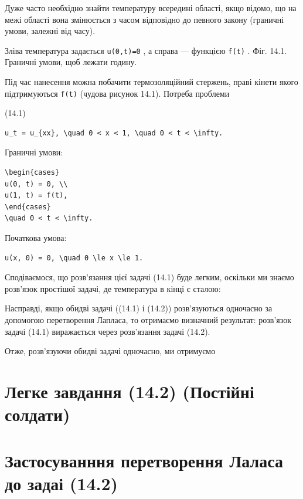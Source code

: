 \documentclass[
  ukrainian,
]{article}
\begin{document}
Дуже часто необхідно знайти температуру всередині області, якщо відомо,
що на межі області вона змінюється з часом відповідно до певного закону
(граничні умови, залежні від часу).

Зліва температура задається \texttt{u(0,t)=0} , а справа --- функцією
\texttt{f(t)} . Фіг. 14.1. Граничні умови, щоб лежати годину.

Під час нанесення можна побачити термозоляційний стержень, праві кінети
якого підтримуються \texttt{f(t)} (чудова рисунок 14.1). Потреба
проблеми

(14.1)

\begin{verbatim}
u_t = u_{xx}, \quad 0 < x < 1, \quad 0 < t < \infty.
\end{verbatim}

Граничні умови:

\begin{verbatim}
\begin{cases}
u(0, t) = 0, \\
u(1, t) = f(t),
\end{cases}
\quad 0 < t < \infty.
\end{verbatim}

Початкова умова:

\begin{verbatim}
u(x, 0) = 0, \quad 0 \le x \le 1.
\end{verbatim}

Сподіваємося, що розв'язання цієї задачі (14.1) буде легким, оскільки ми
знаємо розв'язок простішої задачі, де температура в кінці є сталою:

Насправді, якщо обидві задачі ((14.1) і (14.2)) розв'язуються одночасно
за допомогою перетворення Лапласа, то отримаємо визначний результат:
розв'язок задачі (14.1) виражається через розв'язання задачі (14.2).

Отже, розв'язуючи обидві задачі одночасно, ми отримуємо

\section{Легке завдання (14.2) (Постійні
солдати)}\label{ux43bux435ux433ux43aux435-ux437ux430ux432ux434ux430ux43dux43dux44f-14.2-ux43fux43eux441ux442ux456ux439ux43dux456-ux441ux43eux43bux434ux430ux442ux438}

\section{Застосуванння перетворення Лаласа до задаі
(14.2)}\label{ux437ux430ux441ux442ux43eux441ux443ux432ux430ux43dux43dux43dux44f-ux43fux435ux440ux435ux442ux432ux43eux440ux435ux43dux43dux44f-ux43bux430ux43bux430ux441ux430-ux434ux43e-ux437ux430ux434ux430ux456-14.2}
\end{document}
